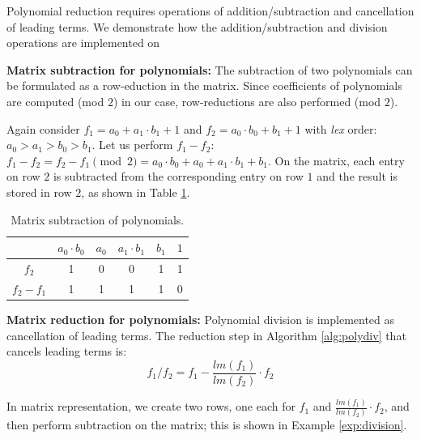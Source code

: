 Polynomial reduction requires operations of addition/subtraction and
cancellation of leading terms. We demonstrate how the
addition/subtraction and division operations are implemented on

{\bf Matrix subtraction for polynomials:} The subtraction of two
polynomials can be formulated as a row-eduction in the matrix. Since
coefficients of polynomials are computed (mod $2$) in our case,
row-reductions are also performed (mod $2$). 
	
\begin{Example}	
	Again consider $f_{1}=a_{0}+a_{1}\cdot b_{1}+1$ and
        $f_{2}=a_{0}\cdot b_{0}+b_{1}+1$ with {\it lex} order:
        $a_{0}>a_{1}>b_{0}>b_{1}$. 
	Let us perform $f_{1}-f_{2}$: %
	$f_{1}-f_{2}=f_{2}-f_{1} \pmod 2=a_{0}\cdot b_{0}+a_{0}+a_{1}\cdot b_{1}+b_{1}$.
	On the matrix, each entry on row $2$ is subtracted from %
        the corresponding entry on row $1$ and the result is stored in row
        $2$, as shown in Table \ref{tab:subtract}.
	
	 \begin{table}[h!]
	\begin{center}
	\caption{Matrix subtraction of polynomials.}
	\label{tab:subtract}
	\begin{tabular}{|c|c|c|c|c|c|} \hline 
			& $a_{0}\cdot b_{0}$  & $a_{0}$ & $a_{1}\cdot b_{1}$ & $b_{1}$ & $1$  \\
	\hline 
	$f_{2}$ & 1 &0 & 0 & 1 & 1 \\
	\hline
	$f_2 - f_{1}$ & 1 &1 & 1 & 1 & 0 \\
	\hline
	\end{tabular}
	\end{center}
	\end{table}
	
\end{Example}

{\bf Matrix reduction for polynomials:} Polynomial
division is implemented as cancellation of leading terms. The
reduction step in Algorithm \ref{alg:polydiv} that cancels leading
terms is:   
\begin{equation}\label{eqn:mat-red}
	{f_1}/{f_2}=f_{1}-\frac{lm(f_1)}{lm(f_2)}\cdot f_{2} 
\end{equation}
 
In matrix representation, 
we create two rows, one each for $f_{1}$ and $\frac{lm(f_1)}{lm(f_2)}\cdot f_{2}$,
and then perform subtraction on the matrix; this is shown in Example
\ref{exp:division}.  
 
